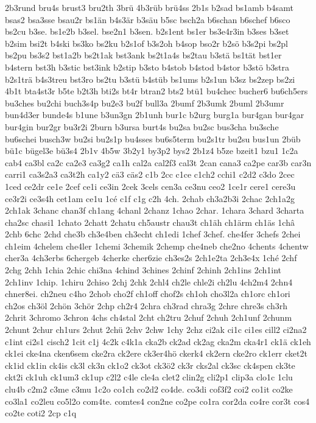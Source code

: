 {2b3rund
bru4s
brust3
bru2th
3brü
4b3rüb
brü4ss
2b1s
b2sad
bs1amb
b4samt
bsas2
bsa3sse
bsau2r
bs1än
b4s3är
b3säu
b5sc
bsch2a
b6schan
b6schef
b6sco
bs2cu
b3se.
bs1e2b
b3sel.
bse2n1
b3sen.
b2s1ent
bs1er
bs3e4r3in
b3ses
b3set
b2sim
bsi2t
b4ski
bs3ko
bs2ku
b2s1of
b3s2oh
b4sop
bso2r
b2sö
b3s2pi
bs2pl
bs2pu
bs3s2
bst1a2b
bs2t1ak
bst3ank
bs2t1a4s
bs2tau
b3stä
bs1tät
bst1er
b4stern
bst3h
b3stic
bst3ink
b2stip
b3sto
b4stob
b4stod
b4stor
b3stö
b3stra
b2s1trä
b4s3treu
bst3ro
bs2tu
b3stü
b4stüb
bs1ums
b2s1un
b3sz
bs2zep
bs2zi
4b1t
bta4st3r
b5te
b2t3h
bti2s
bt4r
btran2
bts2
btü1
bu4chec
bucher6
bu6ch5ers
bu3ches
bu2chi
buch3s4p
bu2e3
bu2f
bull3a
2bumf
2b3umk
2buml
2b3umr
bun4d3er
bunde4s
b1une
b3un3gn
2b1unh
bur1c
b2urg
burg1a
bur4gan
bur4gar
bur4gin
bur2gr
bu3r2i
2burn
b3ursa
burt4s
bu2sa
bu2sc
bus3cha
bu3sche
bu6schei
busch3w
bu2si
bu2s1p
bu4sses
bu6s5term
bu2s1tr
bu2su
bus1un
2büb
bü1c
bügel3e
bü3s4
2b1v
4b5w
3b2y1
by3p2
bys2
2b1z4
b5ze
bzeit1
bzu1
1c2a
cab4
ca3bl
ca2c
ca2e3
ca3g2
ca1h
cal2a
cal2f3
cal3t
2can
cana3
ca2pe
car3b
car3n
carri1
ca3s2a3
ca3t2h
ca1y2
cä3
cäs2
c1b
2cc
c1ce
c1ch2
cchi1
c2d2
c3do
2cec
1ced
ce2dr
ce1e
2cef
ce1i
ce3in
2cek
3cels
cen3a
ce3nu
ceo2
1ce1r
cere1
cere3u
ce3r2i
ce3s4h
cet1am
ce1u
1cé
c1f
c1g
c2h
4ch.
2chab
ch3a2b3i
2chac
2ch1a2g
2ch1ak
3chanc
chan3f
ch1ang
4chanl
2chanz
1chao
2char.
1chara
3chard
3charta
cha2sc
chasi1
1chato
2chatt
2chatu
ch5austr
chau3t
ch1äh
ch1ärm
ch1äs
1châ
2chb
6chc
2chd
che3b
ch3e4ben
ch3echt
ch1edi
1chef
3chef.
che4fer
3chefs
2chei
ch1eim
4chelem
che4ler
1chemi
3chemik
2chemp
che4neb
che2no
4chents
4chentw
cher3a
4ch3erbs
6chergeb
4cherke
cher6zie
ch3es2s
2ch1e2ta
2ch3e4x
1ché
2chf
2chg
2chh
1chia
2chic
chi3na
4chind
3chines
2chinf
2chinh
2ch1ins
2ch1int
2ch1inv
1chip.
1chiru
2chiso
2chj
2chk
2chl4
ch2le
chle2i
ch2lu
4ch2m4
2chn4
chner8ei.
ch2neu
c4ho
2chob
cho2f
ch1off
chof2s
ch1oh
cho3l2a
ch1orc
ch1ori
ch2os
ch3öl
2chön
3chör
2chp
ch2r4
2chra
ch3rad
chra3g
2chre
chre3s
ch3rh
2chrit
3chromo
3chron
4chs
ch4stal
2cht
ch2tru
2chuf
2chuh
2ch1unf
2chunm
2chunt
2chur
ch1urs
2chut
2chü
2chv
2chw
1chy
2chz
ci2ak
ci1c
ci1es
cill2
ci2na2
c1int
ci2s1
cisch2
1cit
c1j
4c2k
c4k1a
cka2b
ck2ad
ck2ag
cka2m
cka4r1
ck1ä
ck1eh
ck1ei
cke4na
cken6sem
cke2ra
ck2ere
ck3er4hö
ckerk4
ck2ern
cke2ro
ck1err
cket2t
ck1id
ck1in
ck4is
ck3l
ck3n
ck1o2
ck3ot
ck3ö2
ck3r
cks2al
ck3sc
ck4spen
ck3te
ckt2i
ck1uh
ck1um3
ck1up
c2l2
c4le
cle4a
clet2
clin2g
cli2p1
clip3a
clo1c
1clu
clu4b
c2m2
c3me
c3mu
1c2o
co1ch
co2d2
co4de.
co3di
cof3f2
coi2
co1it
co2ke
co3la1
co2leu
co5l2o
com4te.
comtes4
con2ne
co2pe
co1ra
cor2da
co4re
cor3t
cos4
co2te
coti2
2cp
c1q
}
